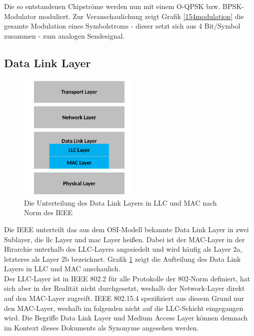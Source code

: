 Die so entstandenen Chipströme werden nun mit einem O-QPSK bzw. BPSK-Modulator moduliert. Zur Veranschaulichung zeigt Grafik \ref{154modulation} die gesamte Modulation eines Symbolstroms - dieser setzt sich aus 4 Bit/Symbol zusammen - zum analogen Sendesignal. \\

\subsection{Data Link Layer}
\begin{figure}
	\centering
	\includegraphics[width=0.5\textwidth]{Grafiken-Alex/ieee-osi.pdf}
	\caption{Die Unterteilung des Data Link Layers in LLC und MAC nach Norm des IEEE}
	\label{ieee-osi}
\end{figure}
Die IEEE unterteilt das aus dem OSI-Modell bekannte Data Link Layer in zwei Sublayer, die \ac{llc} Layer und \acf{mac} Layer heißen. Dabei ist der MAC-Layer in der Hirarchie unterhalb des LLC-Layers angesiedelt und wird häufig als Layer 2a, letzteres als Layer 2b bezeichnet. Grafik \ref{ieee-osi} zeigt die Aufteilung des Data Link Layers in LLC und MAC anschaulich.\\
Der LLC-Layer ist in IEEE 802.2 für alle Protokolle der 802-Norm definiert, hat sich aber in der Realität nicht durchgesetzt, weshalb der Network-Layer direkt auf den MAC-Layer zugreift. \cite{bartusch}IEEE 802.15.4 spezifiziert aus diesem Grund nur den MAC-Layer, weshalb im folgenden nicht auf die LLC-Schicht eingegangen wird. Die Begriffe Data Link Layer und Medium Access Layer können demnach im Kontext dieses Dokuments als Synonyme angesehen werden.
